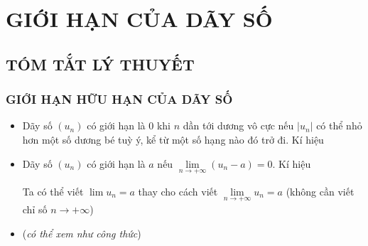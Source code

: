 \setcounter{section}{14}
\section{GIỚI HẠN CỦA DÃY SỐ}
\subsection{TÓM TẮT LÝ THUYẾT}
\subsubsection{GIỚI HẠN HỮU HẠN CỦA DÃY SỐ}
\begin{itemize}
	\item [\iconMT]  Dãy số $(u_n)$ có giới hạn là $0$ khi $n$ dần tới dương vô cực nếu $|u_n|$ có thể nhỏ hơn một số dương bé tuỳ ý, kể từ một số hạng nào đó trở đi.
	Kí hiệu
	\item [\iconMT]   Dãy số $(u_n)$ có giới hạn là $a$ nếu $\lim\limits_{n \to +\infty}(u_n-a)=0$. Kí hiệu
	\begin{luuy}
		Ta có thể viết $\lim u_n=a$ thay cho cách viết $\lim\limits_{n \to +\infty}u_n=a$ (không cần viết chỉ số $n \to +\infty$)
	\end{luuy}
	\item [\iconMT]  (\textit{có thể xem như công thức})
	\begin{gachsoc}
		\begin{itemize}
		\end{itemize}
	\end{gachsoc}
\end{itemize}
